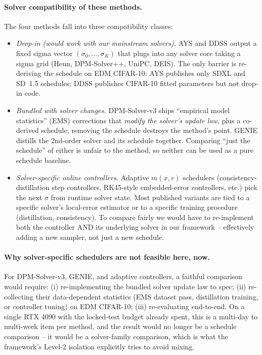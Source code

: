\documentclass[11pt]{article}
\begin{document}
\paragraph{Solver compatibility of these methods.} The four
methods fall into three compatibility classes:

\begin{itemize}
\item \emph{Drop-in (would work with our mainstream solvers).} AYS and
  DDSS output a fixed sigma vector \((\sigma_0,\ldots,\sigma_K)\) that
  plugs into any solver core taking a sigma grid (Heun, DPM-Solver++,
  UniPC, DEIS). The only barrier is re-deriving the schedule on EDM
  CIFAR-10: AYS publishes only SDXL and SD~1.5 schedules; DDSS
  publishes CIFAR-10 fitted parameters but not drop-in code.
\item \emph{Bundled with solver changes.} DPM-Solver-v3 ships
  ``empirical model statistics'' (EMS) corrections that \emph{modify
  the solver's update law}, plus a co-derived schedule; removing the
  schedule destroys the method's point. GENIE distills the
  2nd-order solver and its schedule together. Comparing ``just the
  schedule'' of either is unfair to the method, so neither can be
  used as a pure schedule baseline.
\item \emph{Solver-specific online controllers.} Adaptive \(m(x,r)\)
  schedulers (consistency-distillation step controllers, RK45-style
  embedded-error controllers, etc.) pick the next \(\sigma\) from
  runtime solver state. Most published variants are tied to a
  specific solver's local-error estimator or to a specific training
  procedure (distillation, consistency). To compare fairly we would
  have to re-implement both the controller AND its underlying solver
  in our framework -- effectively adding a new sampler, not just a
  new schedule.
\end{itemize}

\paragraph{Why solver-specific schedulers are not feasible here, now.}
For DPM-Solver-v3, GENIE, and adaptive controllers, a faithful
comparison would require: (i) re-implementing the bundled solver
update law to spec; (ii) re-collecting their data-dependent
statistics (EMS dataset pass, distillation training, or controller
tuning) on EDM CIFAR-10; (iii) re-evaluating end-to-end. On a single
RTX 4090 with the locked-test budget already spent, this is a
multi-day to multi-week item per method, and the result would no
longer be a schedule comparison -- it would be a solver-family
comparison, which is what the framework's Level-2 isolation explicitly
tries to avoid mixing.
\end{document}
